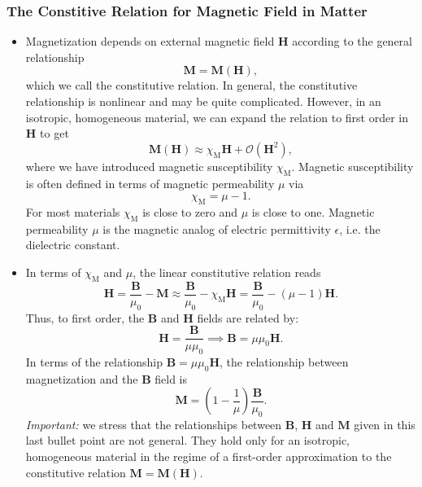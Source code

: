 \documentclass[11pt, a4paper]{article}
\renewcommand{\vec}[1]{\bm{#1}} %
\newcommand{\B}{\vec{B}} %
\renewcommand{\H}{\vec{H}}  %
\newcommand{\M}{\vec{M}}  %
\newcommand{\mm}{\mu_{0}}  %
\begin{document}
\subsubsection{The Constitive Relation for Magnetic Field in Matter}
\begin{itemize}
	\item Magnetization depends on external magnetic field $ \H $ according to the general relationship
	\begin{equation*}
		\M = \M(\H),
	\end{equation*}
	which we call the constitutive relation. In general, the constitutive relationship is nonlinear and may be quite complicated. However, in an isotropic, homogeneous material, we can expand the relation to first order in $ \H $ to get
	\begin{equation*}
		\M(\H) \approx \chi_{\text{M}} \H + \mathcal{O}(\H^{2}),
	\end{equation*}
    where we have introduced magnetic susceptibility $ \chi_{\text{M}} $. Magnetic susceptibility is often defined in terms of magnetic permeability $ \mu $ via
	\begin{equation*}
		\chi_{\text{M}} = \mu - 1.
	\end{equation*}
    For most materials $ \chi_{\text{M}} $ is close to zero and $ \mu $ is close to one. Magnetic permeability $ \mu $ is the magnetic analog of electric permittivity $ \epsilon $, i.e. the dielectric constant.
	
	\item In terms of $ \chi_{\text{M}} $ and $ \mu $, the linear constitutive relation reads
	\begin{equation*}
        \H = \frac{\B}{\mm} - \M \approx \frac{\B}{\mm} - \chi_{\text{M}} \H = \frac{\B}{\mm} - (\mu - 1)\H.
	\end{equation*}
	Thus, to first order, the $ \B $ and $ \H $ fields are related by:
	\begin{equation*}
		\H = \frac{\B}{\mu \mm} \implies \B = \mu \mm \H.
	\end{equation*}
    In terms of the relationship $ \B = \mu \mm \H $, the relationship between magnetization and the $ \B $ field is
	\begin{equation*}
		\M = \left(1 - \frac{1}{\mu}\right)\frac{\B}{\mm}.
	\end{equation*}
    \textit{Important:} we stress that the relationships between $ \B $, $ \H $ and $ \M $ given in this last bullet point are not general. They hold only for an isotropic, homogeneous material in the regime of a first-order approximation to the constitutive relation $ \M = \M(\H) $.
	
\end{itemize}
\end{document}
